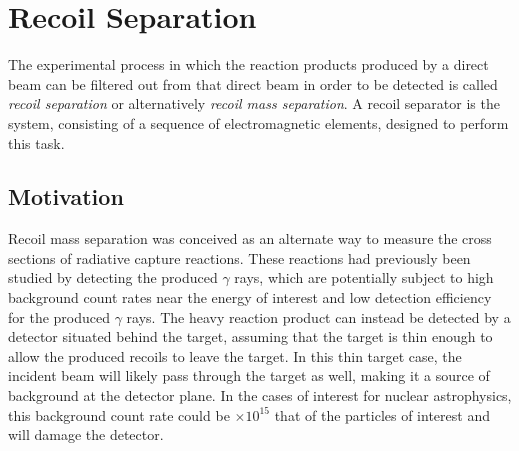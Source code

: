 \section{Recoil Separation}
\label{sec:ch01-recoil-separation}

The experimental process in which the reaction products produced by a
direct beam can be filtered out from that direct beam in order to be
detected is called \emph{recoil separation} or alternatively
\emph{recoil mass separation}. A recoil separator is the system,
consisting of a sequence of electromagnetic elements, designed to
perform this task.

\subsection{Motivation}
\label{ssec:recoil-separation-motivation}

Recoil mass separation was conceived as an alternate way to measure the
cross sections of radiative capture reactions. These reactions had
previously been studied by detecting the produced $\gamma$ rays, which
are potentially subject to high background count rates near the energy
of interest and low detection efficiency for the produced $\gamma$ rays.
The heavy reaction product can instead be detected by a detector
situated behind the target, assuming that the target is thin enough to
allow the produced recoils to leave the target. In this thin target
case, the incident beam will likely pass through the target as well,
making it a source of background at the detector plane. In the cases of
interest for nuclear astrophysics, this background count rate could be
$\times 10^{15}$ that of the particles of interest and will damage the
detector.

